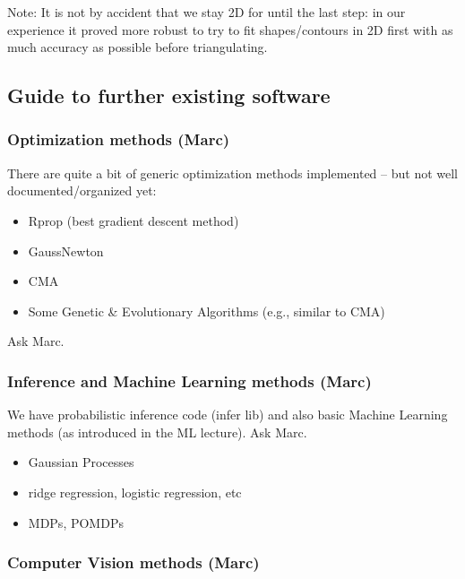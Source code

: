 Note: It is not by accident that we stay 2D for until the last step:
in our experience it proved more robust to try to fit shapes/contours
in 2D first with as much accuracy as possible before triangulating.



\subsection{Guide to further existing software}

\subsubsection{Optimization methods (Marc)}

There are quite a bit of generic optimization methods implemented --
but not well documented/organized yet:

\begin{itemize}
\item Rprop (best gradient descent method)

\item GaussNewton

\item CMA

\item Some Genetic \& Evolutionary Algorithms (e.g., similar to CMA)
\end{itemize}

Ask Marc.



\subsubsection{Inference and Machine Learning methods (Marc)}

We have probabilistic inference code (infer lib) and also basic
Machine Learning methods (as introduced in the ML lecture). Ask Marc.

\begin{itemize}
\item Gaussian Processes

\item ridge regression, logistic regression, etc

\item MDPs, POMDPs
\end{itemize}



\subsubsection{Computer Vision methods (Marc)}

